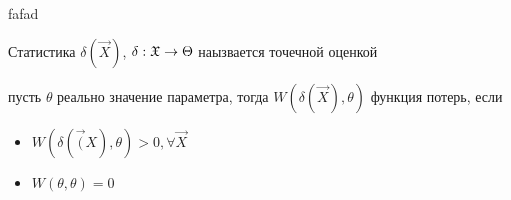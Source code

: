 \documentclass[main.tex]{subfiles}
\begin{document}
fafad

\begin{definition}
	Статистика $\delta ( \vec{X} )$, $\delta : \mathfrak{X} \rightarrow \Theta$ наызвается точечной оценкой
\end{definition}

\begin{definition}
	пусть $\theta$ реально значение параметра, тогда $W(\delta (\vec{X}),\theta)$ функция потерь, если
	\begin{itemize}
	 	\item $W(\delta (\vec(X),\theta)>0,\forall \vec{X}$
	 	\item $W(\theta,\theta)=0$
	 \end{itemize} 
\end{definition}
\end{document}

